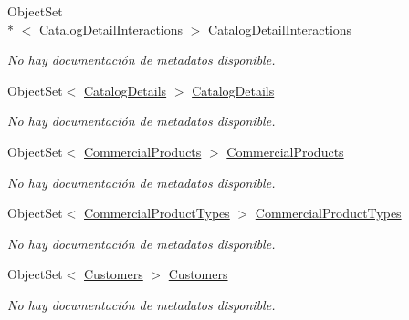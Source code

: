 \begin{DoxyCompactItemize}
Object\-Set\\*
$<$ \hyperlink{class_game_memory_1_1_catalog_detail_interactions}{Catalog\-Detail\-Interactions} $>$ \hyperlink{class_game_memory_1_1_o_m_k_t_d_b_entities_a04d2af206e9f37a53604c9a73ed00fc7}{Catalog\-Detail\-Interactions}
\begin{DoxyCompactList}\small\item\em No hay documentación de metadatos disponible. \end{DoxyCompactList}\item 
Object\-Set$<$ \hyperlink{class_game_memory_1_1_catalog_details}{Catalog\-Details} $>$ \hyperlink{class_game_memory_1_1_o_m_k_t_d_b_entities_a69952a3a5e283da5b13c6e2ca8197a5c}{Catalog\-Details}
\begin{DoxyCompactList}\small\item\em No hay documentación de metadatos disponible. \end{DoxyCompactList}\item 
Object\-Set$<$ \hyperlink{class_game_memory_1_1_commercial_products}{Commercial\-Products} $>$ \hyperlink{class_game_memory_1_1_o_m_k_t_d_b_entities_a8252382d058a524b5788a0cc7aa46fc1}{Commercial\-Products}
\begin{DoxyCompactList}\small\item\em No hay documentación de metadatos disponible. \end{DoxyCompactList}\item 
Object\-Set$<$ \hyperlink{class_game_memory_1_1_commercial_product_types}{Commercial\-Product\-Types} $>$ \hyperlink{class_game_memory_1_1_o_m_k_t_d_b_entities_a203829329349d2b48949ba7b63438281}{Commercial\-Product\-Types}
\begin{DoxyCompactList}\small\item\em No hay documentación de metadatos disponible. \end{DoxyCompactList}\item 
Object\-Set$<$ \hyperlink{class_game_memory_1_1_customers}{Customers} $>$ \hyperlink{class_game_memory_1_1_o_m_k_t_d_b_entities_a4792b11f4a6d49c5ff63ee8f9ebfae2b}{Customers}
\begin{DoxyCompactList}\small\item\em No hay documentación de metadatos disponible. \end{DoxyCompactList}\item 

\end{DoxyCompactItemize}
